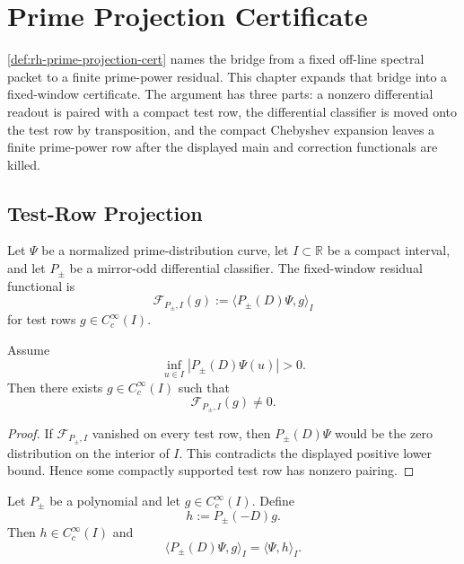\chapter{Prime Projection Certificate}
\label{ch:visions-rh-prime-projection-certificate}

\autoref{def:rh-prime-projection-cert} names the bridge from a fixed
off-line spectral packet to a finite prime-power residual.  This
chapter expands that bridge into a fixed-window certificate.  The
argument has three parts: a nonzero differential readout is paired with
a compact test row, the differential classifier is moved onto the test
row by transposition, and the compact Chebyshev expansion leaves a
finite prime-power row after the displayed main and correction
functionals are killed.

\section{Test-Row Projection}
\label{sec:rh-prime-projection-test-row-projection}

\begin{definition}
\label{def:rh-fixed-window-residual-functional}
Let $\Psi$ be a normalized prime-distribution curve, let $I\subset\mathbb R$
be a compact interval, and let $P_\pm$ be a mirror-odd differential
classifier.  The fixed-window residual functional is
$$
\mathcal F_{P_\pm,I}(g)
:=
\langle P_\pm(D)\Psi,g\rangle_I
$$
for test rows $g\in C_c^\infty(I)$.
\end{definition}

\begin{lemma}
\label{lem:rh-fixed-window-test-separation}
Assume
$$
\inf_{u\in I}|P_\pm(D)\Psi(u)|>0.
$$
Then there exists $g\in C_c^\infty(I)$ such that
$$
\mathcal F_{P_\pm,I}(g)\ne0.
$$
\end{lemma}

\begin{proof}
If $\mathcal F_{P_\pm,I}$ vanished on every test row, then
$P_\pm(D)\Psi$ would be the zero distribution on the interior of $I$.
This contradicts the displayed positive lower bound.  Hence some
compactly supported test row has nonzero pairing.
\end{proof}

\begin{lemma}
\label{lem:rh-differential-classifier-transposition}
Let $P_\pm$ be a polynomial and let $g\in C_c^\infty(I)$.  Define
$$
h:=P_\pm(-D)g.
$$
Then $h\in C_c^\infty(I)$ and
$$
\langle P_\pm(D)\Psi,g\rangle_I
=
\langle \Psi,h\rangle_I.
$$
\end{lemma}

